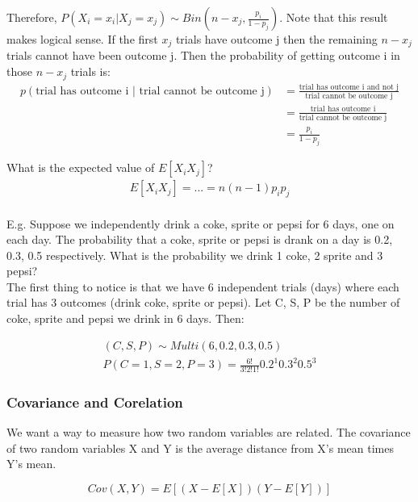 \documentclass[12pt, letterpaper]{article}
\begin{document}
Therefore, $P\left(X_i = x_i \vert X_j = x_j\right) \sim Bin(n - x_j, \frac{p_i}{1 - p_j})$. Note that this result makes logical sense. If the first $x_j$ trials have outcome j then the remaining $n - x_j$ trials cannot have been outcome j. Then the probability of getting outcome i in those $n - x_j$ trials is:
\begin{align*}
p\left(\text{trial has outcome i } \vert \text{ trial cannot be outcome j}\right) &= \frac{\text{trial has outcome i and not j}}{\text{trial cannot be outcome j}}\\
&= \frac{\text{trial has outcome i}}{\text{trial cannot be outcome j}}\\
&= \frac{p_i}{1 - p_j}
\end{align*}

What is the expected value of $E[X_i X_j]$?
\begin{align*}
E[X_i X_j] = ... = n(n - 1)p_i p_j
\end{align*}\\

E.g. Suppose we independently drink a coke, sprite or pepsi for 6 days, one on each day. The probability that a coke, sprite or pepsi is drank on a day is 0.2, 0.3, 0.5 respectively. What is the probability we drink 1 coke, 2 sprite and 3 pepsi?\\

The first thing to notice is that we have 6 independent trials (days) where each trial has 3 outcomes (drink coke, sprite or pepsi). Let C, S, P be the number of coke, sprite and pepsi we drink in 6 days. Then:

\begin{align*}
(C, S, P) \sim Multi(6, 0.2, 0.3, 0.5)\\
P\left(C = 1, S = 2, P = 3\right) = \frac{6!}{3! 2! 1!} 0.2^1 0.3^2 0.5^3
\end{align*}

\subsubsection{Covariance and Corelation}
We want a way to measure how two random variables are related. The covariance of two random variables X and Y is the average distance from X's mean times Y's mean.

\begin{equation}
Cov\left(X, Y\right) = E[(X - E[X])(Y - E[Y])] 
\end{equation}\\
\end{document}
